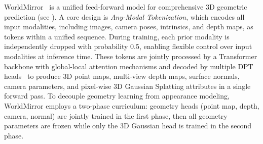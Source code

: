 \documentclass{article} %
\begin{document}
WorldMirror~\cite{liu2025worldmirror} is a unified feed-forward model for comprehensive 3D geometric prediction (see ). A core design is \emph{Any-Modal Tokenization}, which encodes all input modalities, including images, camera poses, intrinsics, and depth maps, as tokens within a unified sequence. During training, each prior modality is independently dropped with probability 0.5, enabling flexible control over input modalities at inference time. These tokens are jointly processed by a Transformer backbone with global-local attention mechanisms and decoded by multiple DPT heads~\cite{wang2025vggt} to produce 3D point maps, multi-view depth maps, surface normals, camera parameters, and pixel-wise 3D Gaussian Splatting attributes in a single forward pass. To decouple geometry learning from appearance modeling, WorldMirror employs a two-phase curriculum: geometry heads (point map, depth, camera, normal) are jointly trained in the first phase, then all geometry parameters are frozen while only the 3D Gaussian head is trained in the second phase.
\end{document}
